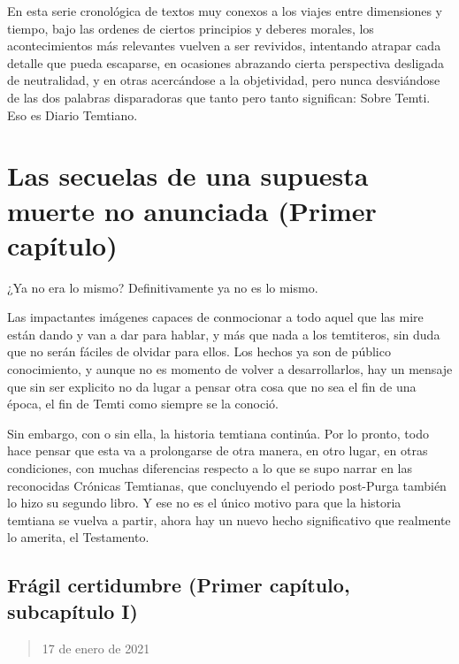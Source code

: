 \documentclass[
  spanish,
]{book}
\begin{document}
En esta serie cronológica de textos muy conexos a los viajes entre dimensiones y tiempo, bajo las ordenes de ciertos principios y deberes morales, los acontecimientos más relevantes vuelven a ser revividos, intentando atrapar cada detalle que pueda escaparse, en ocasiones abrazando cierta perspectiva desligada de neutralidad, y en otras acercándose a la objetividad, pero nunca desviándose de las dos palabras disparadoras que tanto pero tanto significan: Sobre Temti.
Eso es Diario Temtiano.

\hypertarget{las-secuelas-de-una-supuesta-muerte-no-anunciada-primer-capuxedtulo}{%
\chapter{Las secuelas de una supuesta muerte no anunciada (Primer capítulo)}\label{las-secuelas-de-una-supuesta-muerte-no-anunciada-primer-capuxedtulo}}

¿Ya no era lo mismo? Definitivamente ya no es lo mismo.

Las impactantes imágenes capaces de conmocionar a todo aquel que las mire están dando y van a dar para hablar, y más que nada a los temtiteros, sin duda que no serán fáciles de olvidar para ellos.
Los hechos ya son de público conocimiento, y aunque no es momento de volver a desarrollarlos, hay un mensaje que sin ser explicito no da lugar a pensar otra cosa que no sea el fin de una época, el fin de Temti como siempre se la conoció.

Sin embargo, con o sin ella, la historia temtiana continúa. Por lo pronto, todo hace pensar que esta va a prolongarse de otra manera, en otro lugar, en otras condiciones, con muchas diferencias respecto a lo que se supo narrar en las reconocidas Crónicas Temtianas, que concluyendo el periodo post-Purga también lo hizo su segundo libro. Y ese no es el único motivo para que la historia temtiana se vuelva a partir, ahora hay un nuevo hecho significativo que realmente lo amerita, el Testamento.

\hypertarget{fruxe1gil-certidumbre-primer-capuxedtulo-subcapuxedtulo-i}{%
\section{Frágil certidumbre (Primer capítulo, subcapítulo I)}\label{fruxe1gil-certidumbre-primer-capuxedtulo-subcapuxedtulo-i}}

\begin{quote}
17 de enero de 2021
\end{quote}
\end{document}
